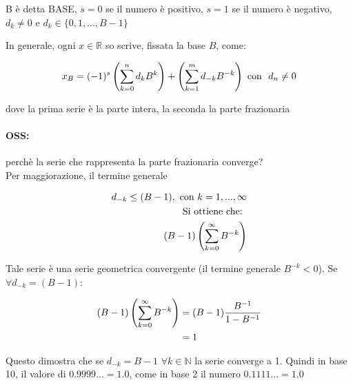 \documentclass[a4paper, 11pt]{article}
\begin{document}
            B è detta BASE, $s = 0$ se il numero è positivo, $s = 1$ se il numero è negativo, $d_k \neq 0$ e $d_k \in \{0, 1, ... , B-1\}$
            


            In generale, ogni $x \in \mathbb{R}$ so scrive, fissata la base $B$, come: 



            \[
                x_B = (-1)^s 
                \left( \sum_{k=0}^n d_k B^k \right) 
                + \left( \sum_{k=1}^m d_{-k} B^{-k} \right) 
                \text{ con \ } d_n \neq 0 \notag
            \]



            dove la prima serie è la parte intera, la seconda la parte frazionaria 
            
            
            
            \paragraph{OSS:}
            perchè la serie che rappresenta la parte frazionaria converge? \\
            Per maggiorazione, il termine generale



            \begin{align}
                d_{-k} \leq (B-1), \text{ con } k = 1, ... , \infty \notag \\\notag
                \text{Si ottiene che: } \\
                (B-1)\left( \sum_{k=0}^\infty B^{-k} \right) \notag 
            \end{align}


            
            Tale serie è una serie geometrica convergente (il termine generale $B^{-k} < 0$).
            Se $\forall d_{-k} = (B-1)$:



            \begin{align}
                (B-1)\left( \sum_{k=0}^\infty B^{-k} \right) &= (B-1) \frac{B^{-1}}{1-B^{-1}} \notag \\
                &= 1 \notag
            \end{align}
            


            Questo dimostra che se $d_{-k} = B-1$  $\forall k \in \mathbb{N}$ la serie converge a 1. Quindi in base 10, il valore di $0.9999... = 1.0$, come in base 2 il numero $0.1111... = 1.0$ 
\end{document}
